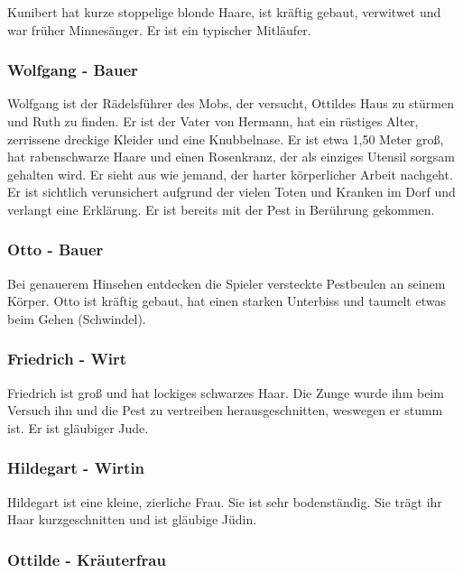 Kunibert hat kurze stoppelige blonde Haare, ist kräftig gebaut, verwitwet und war früher Minnesänger. Er ist ein typischer Mitläufer.

\subsubsection*{Wolfgang - Bauer}
\label{Wolfgang}

Wolfgang ist der Rädelsführer des Mobs, der versucht, Ottildes Haus zu stürmen und Ruth zu finden. Er ist der Vater von Hermann, hat ein rüstiges Alter, zerrissene dreckige Kleider und eine Knubbelnase. Er ist etwa 1,50 Meter groß, hat rabenschwarze Haare und einen Rosenkranz, der als einziges Utensil sorgsam gehalten wird. Er sieht aus wie jemand, der harter körperlicher Arbeit nachgeht. Er ist sichtlich verunsichert aufgrund der vielen Toten und Kranken im Dorf und verlangt eine Erklärung. Er ist bereits mit der Pest in Berührung gekommen.

\subsubsection*{Otto - Bauer}
\label{Otto}

Bei genauerem Hinsehen entdecken die Spieler versteckte Pestbeulen an seinem Körper. Otto ist kräftig gebaut, hat einen starken Unterbiss und taumelt etwas beim Gehen (Schwindel).

\subsubsection*{Friedrich - Wirt}
\label{Friedrich}

Friedrich ist groß und hat lockiges schwarzes Haar. Die Zunge wurde ihm beim Versuch ihn und die Pest zu vertreiben herausgeschnitten, weswegen er stumm ist. Er ist gläubiger Jude.

\subsubsection*{Hildegart - Wirtin}
\label{Hildegart}

Hildegart ist eine kleine, zierliche Frau. Sie ist sehr bodenständig. Sie trägt ihr Haar kurzgeschnitten und ist gläubige Jüdin.

\subsubsection*{Ottilde - Kräuterfrau}
\label{Ottilde}

